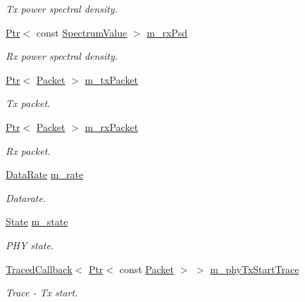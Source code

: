 \begin{DoxyCompactItemize}
\begin{DoxyCompactList}\small\item\em Tx power spectral density. \end{DoxyCompactList}\item 
\hyperlink{classns3_1_1Ptr}{Ptr}$<$ const \hyperlink{classns3_1_1SpectrumValue}{Spectrum\+Value} $>$ \hyperlink{classns3_1_1HalfDuplexIdealPhy_a17dfdb0350a690c50953deb78318025e}{m\+\_\+rx\+Psd}
\begin{DoxyCompactList}\small\item\em Rx power spectral density. \end{DoxyCompactList}\item 
\hyperlink{classns3_1_1Ptr}{Ptr}$<$ \hyperlink{classns3_1_1Packet}{Packet} $>$ \hyperlink{classns3_1_1HalfDuplexIdealPhy_abdf5e830cf997ebddb20aa057198449e}{m\+\_\+tx\+Packet}
\begin{DoxyCompactList}\small\item\em Tx packet. \end{DoxyCompactList}\item 
\hyperlink{classns3_1_1Ptr}{Ptr}$<$ \hyperlink{classns3_1_1Packet}{Packet} $>$ \hyperlink{classns3_1_1HalfDuplexIdealPhy_aa1122da72d7425d4bebb0cd65d442db1}{m\+\_\+rx\+Packet}
\begin{DoxyCompactList}\small\item\em Rx packet. \end{DoxyCompactList}\item 
\hyperlink{classns3_1_1DataRate}{Data\+Rate} \hyperlink{classns3_1_1HalfDuplexIdealPhy_aa01f82bb346c8d25dbfbf9da2217f09f}{m\+\_\+rate}
\begin{DoxyCompactList}\small\item\em Datarate. \end{DoxyCompactList}\item 
\hyperlink{classns3_1_1HalfDuplexIdealPhy_acc684e2a6ce03ae8ff429ce480f61c3a}{State} \hyperlink{classns3_1_1HalfDuplexIdealPhy_a6b5ae8a00ae9c4e50b2a099a534a1863}{m\+\_\+state}
\begin{DoxyCompactList}\small\item\em P\+HY state. \end{DoxyCompactList}\item 
\hyperlink{classns3_1_1TracedCallback}{Traced\+Callback}$<$ \hyperlink{classns3_1_1Ptr}{Ptr}$<$ const \hyperlink{classns3_1_1Packet}{Packet} $>$ $>$ \hyperlink{classns3_1_1HalfDuplexIdealPhy_a67000e94f4c6a40b808ff6c95fefdf7f}{m\+\_\+phy\+Tx\+Start\+Trace}
\begin{DoxyCompactList}\small\item\em Trace -\/ Tx start. \end{DoxyCompactList}\item 

\end{DoxyCompactItemize}
